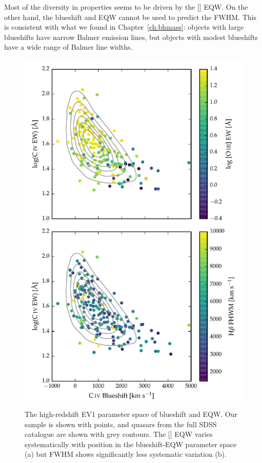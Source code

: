 Most of the diversity in  properties seems to be driven by the [] \ac{EQW}. 
On the other hand, the  blueshift and \ac{EQW} cannot be used to predict the \hb FWHM. 
This is consistent with what we found in Chapter~\ref{ch:bhmass}: objects with large  blueshifts have narrow Balmer emission lines, but objects with modest  blueshifts have a wide range of Balmer line widths. 

\begin{figure}
    \includegraphics[width=\columnwidth]{figures/chapter04/ev1.pdf} 
    \caption{The high-redshift \ac{EV1} parameter space of  blueshift and \ac{EQW}. Our sample is shown with points, and quasars from the full \ac{SDSS} catalogue are shown with grey contours. The [] EQW varies systematically with position in the  blueshift-\ac{EQW} parameter space (a) but \hb FWHM shows significantly less systematic variation (b).}      
    \label{fig:ev1}
\end{figure}

